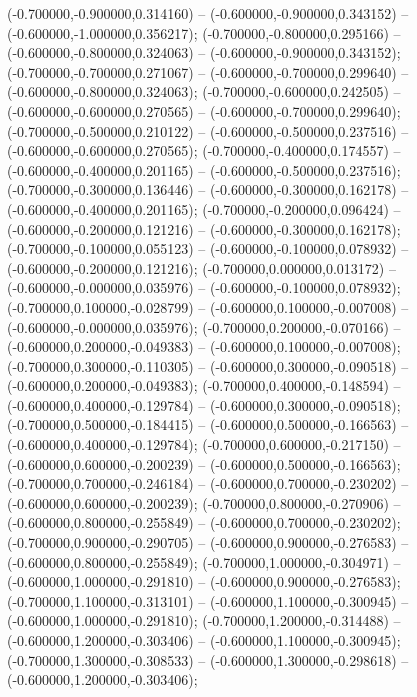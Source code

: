  (-0.700000,-0.900000,0.314160) -- (-0.600000,-0.900000,0.343152) -- (-0.600000,-1.000000,0.356217);
 (-0.700000,-0.800000,0.295166) -- (-0.600000,-0.800000,0.324063) -- (-0.600000,-0.900000,0.343152);
 (-0.700000,-0.700000,0.271067) -- (-0.600000,-0.700000,0.299640) -- (-0.600000,-0.800000,0.324063);
 (-0.700000,-0.600000,0.242505) -- (-0.600000,-0.600000,0.270565) -- (-0.600000,-0.700000,0.299640);
 (-0.700000,-0.500000,0.210122) -- (-0.600000,-0.500000,0.237516) -- (-0.600000,-0.600000,0.270565);
 (-0.700000,-0.400000,0.174557) -- (-0.600000,-0.400000,0.201165) -- (-0.600000,-0.500000,0.237516);
 (-0.700000,-0.300000,0.136446) -- (-0.600000,-0.300000,0.162178) -- (-0.600000,-0.400000,0.201165);
 (-0.700000,-0.200000,0.096424) -- (-0.600000,-0.200000,0.121216) -- (-0.600000,-0.300000,0.162178);
 (-0.700000,-0.100000,0.055123) -- (-0.600000,-0.100000,0.078932) -- (-0.600000,-0.200000,0.121216);
 (-0.700000,0.000000,0.013172) -- (-0.600000,-0.000000,0.035976) -- (-0.600000,-0.100000,0.078932);
 (-0.700000,0.100000,-0.028799) -- (-0.600000,0.100000,-0.007008) -- (-0.600000,-0.000000,0.035976);
 (-0.700000,0.200000,-0.070166) -- (-0.600000,0.200000,-0.049383) -- (-0.600000,0.100000,-0.007008);
 (-0.700000,0.300000,-0.110305) -- (-0.600000,0.300000,-0.090518) -- (-0.600000,0.200000,-0.049383);
 (-0.700000,0.400000,-0.148594) -- (-0.600000,0.400000,-0.129784) -- (-0.600000,0.300000,-0.090518);
 (-0.700000,0.500000,-0.184415) -- (-0.600000,0.500000,-0.166563) -- (-0.600000,0.400000,-0.129784);
 (-0.700000,0.600000,-0.217150) -- (-0.600000,0.600000,-0.200239) -- (-0.600000,0.500000,-0.166563);
 (-0.700000,0.700000,-0.246184) -- (-0.600000,0.700000,-0.230202) -- (-0.600000,0.600000,-0.200239);
 (-0.700000,0.800000,-0.270906) -- (-0.600000,0.800000,-0.255849) -- (-0.600000,0.700000,-0.230202);
 (-0.700000,0.900000,-0.290705) -- (-0.600000,0.900000,-0.276583) -- (-0.600000,0.800000,-0.255849);
 (-0.700000,1.000000,-0.304971) -- (-0.600000,1.000000,-0.291810) -- (-0.600000,0.900000,-0.276583);
 (-0.700000,1.100000,-0.313101) -- (-0.600000,1.100000,-0.300945) -- (-0.600000,1.000000,-0.291810);
 (-0.700000,1.200000,-0.314488) -- (-0.600000,1.200000,-0.303406) -- (-0.600000,1.100000,-0.300945);
 (-0.700000,1.300000,-0.308533) -- (-0.600000,1.300000,-0.298618) -- (-0.600000,1.200000,-0.303406);
